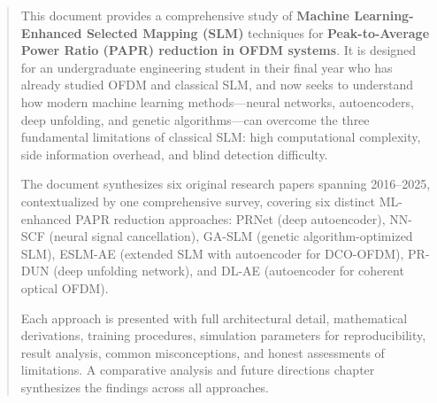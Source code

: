 \documentclass[11pt, a4paper, openany]{book}
\begin{document}
\hypersetup{pageanchor=true}

\begin{abstract}
This document provides a comprehensive study of \textbf{Machine Learning-Enhanced
Selected Mapping (SLM)} techniques for \textbf{Peak-to-Average Power Ratio (PAPR)
reduction in OFDM systems}.  It is designed for an undergraduate engineering
student in their final year who has already studied OFDM and classical SLM, and
now seeks to understand how modern machine learning methods---neural networks,
autoencoders, deep unfolding, and genetic algorithms---can overcome the three
fundamental limitations of classical SLM: high computational complexity, side
information overhead, and blind detection difficulty.

The document synthesizes six original research papers spanning 2016--2025,
contextualized by one comprehensive survey, covering six distinct
ML-enhanced PAPR reduction approaches: PRNet (deep autoencoder), NN-SCF
(neural signal cancellation), GA-SLM (genetic algorithm-optimized SLM),
ESLM-AE (extended SLM with autoencoder for DCO-OFDM), PR-DUN (deep
unfolding network), and DL-AE (autoencoder for coherent optical OFDM).

Each approach is presented with full architectural detail, mathematical
derivations, training procedures, simulation parameters for reproducibility,
result analysis, common misconceptions, and honest assessments of
limitations.  A comparative analysis and future directions chapter
synthesizes the findings across all approaches.
\end{abstract}

\tableofcontents
\clearpage

{}
\listoffigures
\clearpage

{}
\listoftables
\clearpage



\clearpage












\end{document}
